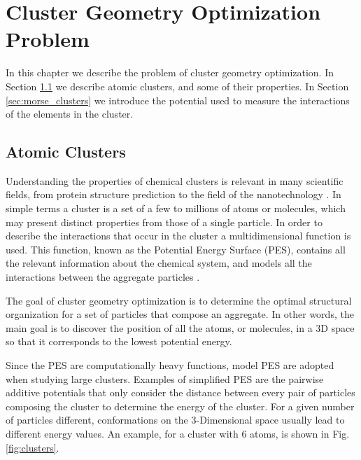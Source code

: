 \chapter{Cluster Geometry Optimization Problem}
In this chapter we describe the problem of cluster geometry optimization. In Section \ref{sec:atomic_cluster} we describe atomic clusters, and some of their properties. In Section \ref{sec:morse_clusters} we introduce the potential used to measure the interactions of the elements in the cluster.

\section{Atomic Clusters}
\label{sec:atomic_cluster}

Understanding the properties of chemical clusters is relevant in many scientific fields, from protein structure prediction to the field of the nanotechnology \cite{wales97}. In simple terms a cluster is a set of a few to millions of atoms or molecules, which may present distinct properties from those of a single particle. In order to describe the interactions that occur in the cluster a multidimensional function is used. This function, known as the Potential Energy Surface (PES), contains all the relevant information about the chemical system, and models all the interactions between the aggregate particles \cite{doye06}.

The goal of cluster geometry optimization is to determine the optimal structural organization for a set of particles that compose an aggregate. In other words, the main goal is to discover the position of all the atoms, or molecules, in a 3D space so that it corresponds to the lowest potential energy.

Since the PES are computationally heavy functions, model PES are adopted when studying large clusters. Examples of simplified PES are the pairwise additive potentials that only consider the distance between every pair of particles composing the cluster to determine the energy of the cluster. For a given number of particles different, conformations on the 3-Dimensional space usually lead to different energy values. An example, for a cluster with 6 atoms, is shown in Fig. \ref{fig:clusters}.



